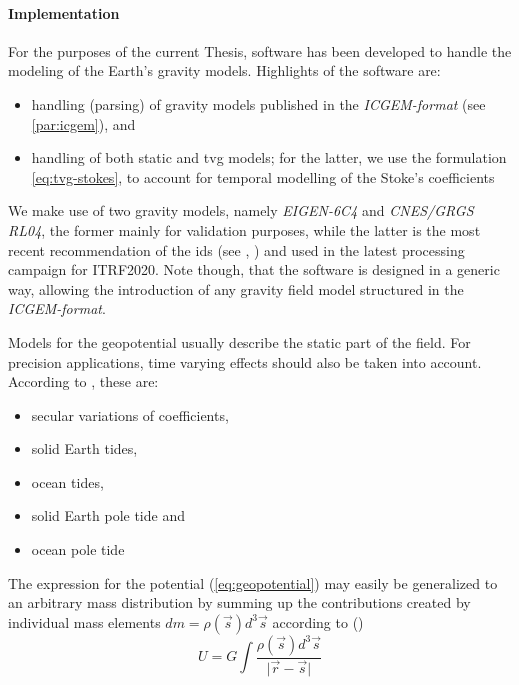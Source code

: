 \paragraph{Implementation}\label{par:implementation}
For the purposes of the current Thesis, software has been developed to handle the 
modeling of the Earth's gravity models. Highlights of the software are:
\begin{itemize}
  \item handling (parsing) of gravity models published in the \emph{ICGEM-format} (see \ref{par:icgem}), and
  \item handling of both static and \gls{tvg} models; for the latter, we use the 
    formulation \ref{eq:tvg-stokes}, to account for temporal modelling of the 
    Stoke's coefficients
\end{itemize}

We make use of two gravity models, namely \emph{EIGEN-6C4} \cite{Forste2014} and \emph{CNES/GRGS RL04}, 
the former mainly for validation purposes, while the latter is the most recent 
recommendation of the \gls{ids} (see \cite{ids-standards-itrf2020}, \cite{stepanek2022}) 
and used in the latest processing campaign for ITRF2020. Note though, that the software 
is designed in a generic way, allowing the introduction of any gravity field model 
structured in the \emph{ICGEM-format}.

\iffalse
Models for the geopotential usually describe the static part of the field. For 
precision applications, time varying effects should also be taken into account. 
According to \cite{iers2010}, these are:
\begin{itemize}
  \item secular variations of coefficients,
  \item solid Earth tides,
  \item ocean tides,
  \item solid Earth pole tide and
  \item ocean pole tide
\end{itemize}

The expression for the potential (\ref{eq:geopotential}) may easily be 
generalized to an arbitrary mass distribution by summing up the contributions 
created by individual mass elements
\(dm = \rho(\vec{s}) d^3 \vec{s}\) according to (\cite{Montenbruck2000})
\begin{equation}
    U = G \int{\frac{\rho(\vec{s}) d^3 \vec{s}}{\lvert \vec{r} - \vec{s} \rvert}}
\end{equation}


